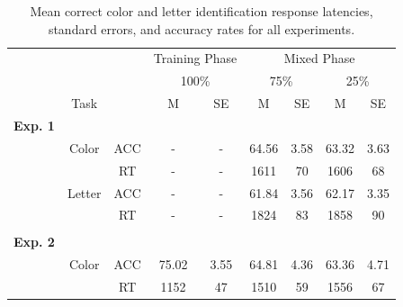 \documentclass[english,,man,floatsintext]{apa6}
\begin{document}
\begin{table}[htbp]
\caption{Mean correct color and letter identification response latencies, standard errors, and accuracy rates for all experiments.}
\label{IC_table}
\centering
\begin{tabular}{cccccccccc}
 & & & & \multicolumn{2}{c}{Training Phase} & \multicolumn{4}{c}{Mixed Phase} \\
\cmidrule(rl){5-6}
\cmidrule(rl){7-10}
 & & & & \multicolumn{2}{c}{100\%} & \multicolumn{2}{c}{75\%} & \multicolumn{2}{c}{25\%}  \\
\cmidrule(rl){5-6}
\cmidrule(rl){7-8}
\cmidrule(rl){9-10}
 & & \multicolumn{1}{c}{Task} & & \multicolumn{1}{c}{M} & \multicolumn{1}{c}{SE} & \multicolumn{1}{c}{M} & \multicolumn{1}{c}{SE} & \multicolumn{1}{c}{M} & \multicolumn{1}{c}{SE} \\
\midrule
\multicolumn{2}{l}{\textbf{Exp. 1}}  &   &    &     &     &    &  & & \\
& & \multicolumn{1}{c}{Color} & \multicolumn{1}{c}{ACC} & \multicolumn{1}{c}{-} & \multicolumn{1}{c}{-} & \multicolumn{1}{c}{64.56} & \multicolumn{1}{c}{3.58} & \multicolumn{1}{c}{63.32} & \multicolumn{1}{c}{3.63} \\
& & & \multicolumn{1}{c}{RT} & \multicolumn{1}{c}{-} & \multicolumn{1}{c}{-} & \multicolumn{1}{c}{1611} & \multicolumn{1}{c}{70} & \multicolumn{1}{c}{1606} & \multicolumn{1}{c}{68} \\
& & \multicolumn{1}{c}{Letter} & \multicolumn{1}{c}{ACC} & \multicolumn{1}{c}{-} & \multicolumn{1}{c}{-} & \multicolumn{1}{c}{61.84} & \multicolumn{1}{c}{3.56} & \multicolumn{1}{c}{62.17} & \multicolumn{1}{c}{3.35} \\
& & & \multicolumn{1}{c}{RT} & \multicolumn{1}{c}{-} & \multicolumn{1}{c}{-} & \multicolumn{1}{c}{1824} & \multicolumn{1}{c}{83} & \multicolumn{1}{c}{1858} & \multicolumn{1}{c}{90} \\
\cmidrule(l){2-10}
 &  & & & & & & & & \\
\multicolumn{2}{l}{\textbf{Exp. 2}}  &   &    &     &     &    &  & & \\
& & \multicolumn{1}{c}{Color} & \multicolumn{1}{c}{ACC} & \multicolumn{1}{c}{75.02} & \multicolumn{1}{c}{3.55} & \multicolumn{1}{c}{64.81} & \multicolumn{1}{c}{4.36} & \multicolumn{1}{c}{63.36} & \multicolumn{1}{c}{4.71} \\
& & & \multicolumn{1}{c}{RT} & \multicolumn{1}{c}{1152} & \multicolumn{1}{c}{47} & \multicolumn{1}{c}{1510} & \multicolumn{1}{c}{59} & \multicolumn{1}{c}{1556} & \multicolumn{1}{c}{67} \\

\end{tabular}
\end{table}
\end{document}
